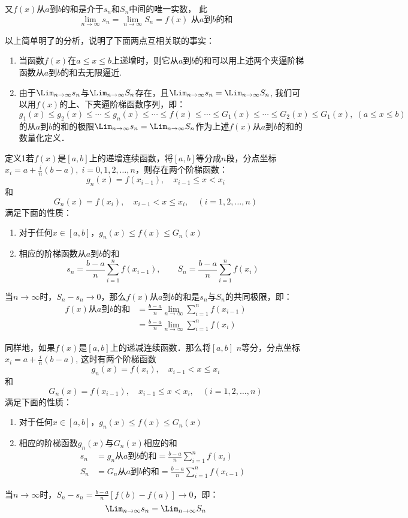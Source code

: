 \begin{solution}
又$f(x)$从$a$到$b$的和是介于$s_n$和$S_n$中间的唯一实数，
此
\[\lim_{n\to\infty} s_n=\lim_{n\to\infty} S_n=f(x)\text{ 从$a$到$b$的和}\]

以上简单明了的分析，说明了下面两点互相关联的事实：
\begin{enumerate}
    \item 当函数$f(x)$在$a\le x\le b$上递增时，则它从$a$到$b$的和可以用上述两个夹逼阶梯函数从$a$到$b$的和去无限逼近.
    \item 由于$\Lim_{n\to\infty}s_n$与$\Lim_{n\to\infty}S_n$存在，且$\Lim_{n\to\infty}s_n=\Lim_{n\to\infty}S_n$, 我们可以用$f(x)$的上、下夹逼阶梯函数序列，即：$g_1 (x)\le g_2(x)\le \cdots\le g_n(x)\le \cdots\le f(x)\le \cdots\le G_1(x)\le \cdots\le G_2(x)\le G_1(x),\; (a\le x\le b)$的从$a$到$b$的和的极限$\Lim_{n\to\infty}s_n=\Lim_{n\to\infty}S_n$作为上述$f(x)$从$a$到$b$的和的数量化定义．
\end{enumerate}
\end{solution}

\begin{blk}
    {定义1}若$f(x)$是$[a,b]$上的递增连续函数，将$[a,b]$等分成$n$段，分点坐标$x_i=a+\frac{i}{n}(b-a),\; i=0,1, 2,\ldots,n$，则存在两个阶梯函数：
\[    g_n (x) =f (x_{i-1}) ,\quad x_{i-1}\le  x< x_i\]
    和
\[    G_n (x)=f(x_i),\quad x_{i-1}<x\le x_i,\quad (i=1,2,\ldots,n)\]
满足下面的性质：
\begin{enumerate}
    \item 对于任何$x\in[a,b]$，$g_n(x)\le f(x)\le G_n(x)$
    \item 相应的阶梯函数从$a$到$b$的和
\[s_n=\frac{b-a}{n}\sum^n_{i=1}f(x_{i-1}),\qquad S_n=\frac{b-a}{n}\sum^n_{i=1}f(x_{i})  \]
\end{enumerate}
当$n\to\infty$时，$S_n-s_n\to 0$，那么$f(x)$从$a$到$b$的和是$s_n$与$S_n$的共同极限，即：
\begin{align*}
f(x)\text{从$a$到$b$的和}&=\frac{b-a}{n}\lim_{n\to\infty}\sum^n_{i=1}f(x_{i-1})\\
&=\frac{b-a}{n}\lim_{n\to\infty}\sum^n_{i=1}f(x_{i})
\end{align*}

同样地，如果$f(x)$是$[a,b]$上的递减连续函数．那么将$[a,b]$ $n$等分，分点坐标$x_i=a+\frac{i}{n}(b-a)$, 这时有两个阶梯函数
\[    g_n (x) =f (x_{i}) ,\quad x_{i-1}<  x\le x_i\]
    和
\[    G_n (x)=f(x_{i-1}),\quad x_{i-1}\le x< x_i,\quad (i=1,2,\ldots,n)\]
满足下面的性质：
\begin{enumerate}
    \item 对于任何$x\in[a,b]$，$g_n(x)\le f(x)\le G_n(x)$
    \item 相应的阶梯函数$g_n(x)$与$G_n(x)$相应的和
\begin{align*}
    s_n&=g_n\text{从$a$到$b$的和}=\frac{b-a}{n}\sum^n_{i=1}f(x_{i})\\
    S_n&=G_n\text{从$a$到$b$的和}=\frac{b-a}{n}\sum^n_{i=1}f(x_{i-1})  
\end{align*}
\end{enumerate}
当$n\to\infty$时，$S_n-s_n=\frac{b-a}{n}\left[f(b)-f(a)\right]\to 0$，即：
\[\Lim_{n\to\infty}s_n=\Lim_{n\to\infty}S_n\]
\end{blk}

